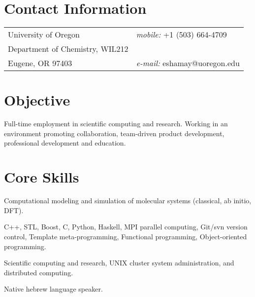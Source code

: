 \documentclass[margin,line]{res}
\begin{document}

\begin{resume}
\section{\sc Contact Information}
\vspace{.05in}
\begin{tabular}{@{}p{3.5in}p{3.5in}}
University of Oregon             		& {\it mobile:}  +1 (503) 664-4709\\
Department of Chemistry, WIL212         & \\
Eugene, OR 97403                    	& {\it e-mail:}  eshamay@uoregon.edu
\end{tabular}


\section{\sc Objective}
Full-time employment in scientific computing and research. Working in an environment promoting collaboration, team-driven product development, professional development and education.



\section{\sc Core Skills} 
Computational modeling and simulation of molecular systems (classical, ab initio, DFT).

\vspace*{-.1in}
C++, STL, Boost, C, Python, Haskell, MPI parallel computing, Git/svn version control, Template meta-programming, Functional programming, Object-oriented programming.

\vspace*{-.1in}
Scientific computing and research, UNIX cluster system administration, and distributed computing.

\vspace*{-.1in}
Native hebrew language speaker.


\end{resume}
\end{document}
